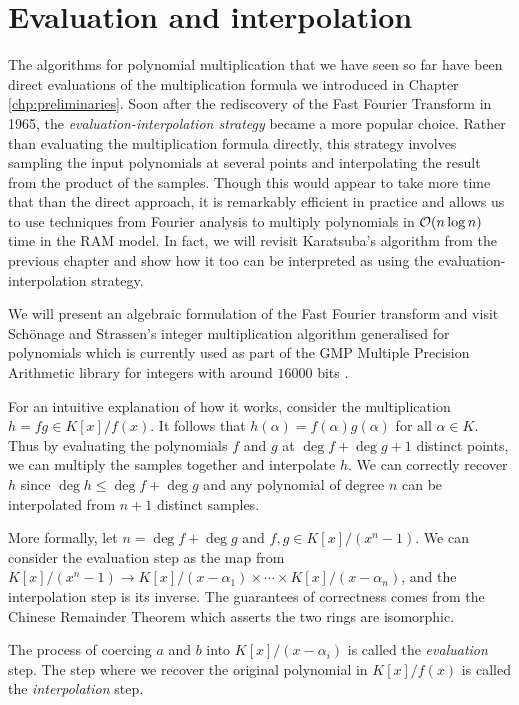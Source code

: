 \chapter{Evaluation and interpolation}\label{chp:eval-interp}

The algorithms for polynomial multiplication that we have seen so far have been direct evaluations of the multiplication formula we introduced in Chapter \ref{chp:preliminaries}. Soon after the rediscovery of the Fast Fourier Transform in 1965, the \textit{evaluation-interpolation strategy} became a more popular choice. Rather than evaluating the multiplication formula directly, this strategy involves sampling the input polynomials at several points and interpolating the result from the product of the samples. Though this would appear to take more time that than the direct approach, it is remarkably efficient in practice and allows us to use techniques from Fourier analysis to multiply polynomials in $\mathcal O(n \log n)$ time in the RAM model. In fact, we will revisit Karatsuba's algorithm from the previous chapter and show how it too can be interpreted as using the evaluation-interpolation strategy.

We will present an algebraic formulation of the Fast Fourier transform and visit Sch\"{o}nage and Strassen's integer multiplication algorithm generalised for polynomials which is currently used as part of the GMP Multiple Precision Arithmetic library for integers with around $16000$ bits \cite{gmp}.

For an intuitive explanation of how it works, consider the multiplication $h = fg \in K[x] / f(x)$. It follows that $h(\alpha) = f(\alpha)g(\alpha)$ for all $\alpha \in K$. Thus by evaluating the polynomials $f$ and $g$ at $\deg f + \deg g + 1$ distinct points, we can multiply the samples together and interpolate $h$. We can correctly recover $h$ since $\deg h \le \deg f + \deg g$ and any polynomial of degree $n$ can be interpolated from $n + 1$ distinct samples.

More formally, let $n = \deg f + \deg g$ and $f, g \in K[x]/(x^n - 1)$. We can consider the evaluation step as the map from $K[x]/(x^n - 1) \to K[x]/(x - \alpha_1) \times \cdots \times K[x]/(x - \alpha_n)$, and the interpolation step is its inverse. The guarantees of correctness comes from the Chinese Remainder Theorem which asserts the two rings are isomorphic.

The process of coercing $a$ and $b$ into $K[x]/ (x - \alpha_i)$ is called the \emph{evaluation} step. The step where we recover the original polynomial in $K[x]/f(x)$ is called the \emph{interpolation} step.

